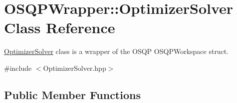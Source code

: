 \section{O\+S\+Q\+P\+Wrapper\+:\+:Optimizer\+Solver Class Reference}
\label{classOSQPWrapper_1_1OptimizerSolver}


\hyperlink{classOSQPWrapper_1_1OptimizerSolver}{Optimizer\+Solver} class is a wrapper of the O\+S\+QP O\+S\+Q\+P\+Workspace struct.  




{\ttfamily \#include $<$Optimizer\+Solver.\+hpp$>$}

\subsection*{Public Member Functions}

